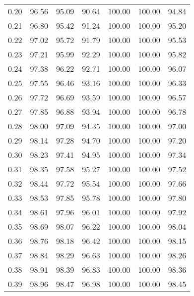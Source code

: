 \begin{tabular}{|c|c|c|c|c|c|c|}
      0.20 &     96.56 &     95.09 &      90.64 &  100.00 &     100.00 &         94.84 \\
      0.21 &     96.80 &     95.42 &      91.24 &  100.00 &     100.00 &         95.20 \\
      0.22 &     97.02 &     95.72 &      91.79 &  100.00 &     100.00 &         95.53 \\
      0.23 &     97.21 &     95.99 &      92.29 &  100.00 &     100.00 &         95.82 \\
      0.24 &     97.38 &     96.22 &      92.71 &  100.00 &     100.00 &         96.07 \\
      0.25 &     97.55 &     96.46 &      93.16 &  100.00 &     100.00 &         96.33 \\
      0.26 &     97.72 &     96.69 &      93.59 &  100.00 &     100.00 &         96.57 \\
      0.27 &     97.85 &     96.88 &      93.94 &  100.00 &     100.00 &         96.78 \\
      0.28 &     98.00 &     97.09 &      94.35 &  100.00 &     100.00 &         97.00 \\
      0.29 &     98.14 &     97.28 &      94.70 &  100.00 &     100.00 &         97.20 \\
      0.30 &     98.23 &     97.41 &      94.95 &  100.00 &     100.00 &         97.34 \\
      0.31 &     98.35 &     97.58 &      95.27 &  100.00 &     100.00 &         97.52 \\
      0.32 &     98.44 &     97.72 &      95.54 &  100.00 &     100.00 &         97.66 \\
      0.33 &     98.53 &     97.85 &      95.78 &  100.00 &     100.00 &         97.80 \\
      0.34 &     98.61 &     97.96 &      96.01 &  100.00 &     100.00 &         97.92 \\
      0.35 &     98.69 &     98.07 &      96.22 &  100.00 &     100.00 &         98.04 \\
      0.36 &     98.76 &     98.18 &      96.42 &  100.00 &     100.00 &         98.15 \\
      0.37 &     98.84 &     98.29 &      96.63 &  100.00 &     100.00 &         98.26 \\
      0.38 &     98.91 &     98.39 &      96.83 &  100.00 &     100.00 &         98.36 \\
      0.39 &     98.96 &     98.47 &      96.98 &  100.00 &     100.00 &         98.45 \\

\end{tabular}
